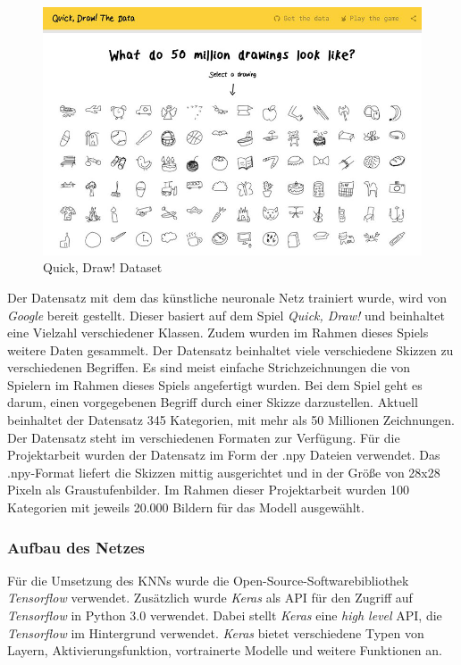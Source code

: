 \documentclass[11pt]{article}
\begin{document}
\begin{figure}[ht]
\centering
\includegraphics[width=1\textwidth]{images/QuickDrawData.jpg}
\caption{\label{fig:classDiagram}Quick, Draw! Dataset}
\end{figure}

Der Datensatz mit dem das künstliche neuronale Netz trainiert wurde, wird von \textit{Google} bereit gestellt. Dieser basiert auf dem Spiel \textit{Quick, Draw!} und beinhaltet eine Vielzahl verschiedener Klassen.  Zudem wurden im Rahmen dieses Spiels weitere Daten gesammelt. Der Datensatz beinhaltet viele verschiedene Skizzen zu verschiedenen Begriffen. Es sind meist einfache Strichzeichnungen die von Spielern im Rahmen dieses Spiels angefertigt wurden. Bei dem Spiel geht es darum, einen vorgegebenen Begriff durch einer Skizze darzustellen. Aktuell beinhaltet der Datensatz 345 Kategorien, mit mehr als 50 Millionen Zeichnungen. Der Datensatz steht im verschiedenen Formaten zur Verfügung.
Für die Projektarbeit wurden der Datensatz im Form der .npy Dateien verwendet. Das .npy-Format liefert die Skizzen mittig ausgerichtet und in der Größe von 28x28 Pixeln als Graustufenbilder.\parencite{GoogleCreativeLab2018}
Im Rahmen dieser Projektarbeit wurden 100 Kategorien mit jeweils 20.000 Bildern für das Modell ausgewählt.

\subsubsection{Aufbau des Netzes}
\label{sec:AufbauNetz}
Für die Umsetzung des KNNs wurde die Open-Source-Softwarebibliothek \textit{Tensorflow} verwendet. Zusätzlich wurde \textit{Keras} als API für den Zugriff auf \textit{Tensorflow} in Python 3.0 verwendet. Dabei stellt \textit{Keras} eine \textit{high level} API, die \textit{Tensorflow} im Hintergrund verwendet. \textit{Keras} bietet verschiedene Typen von Layern, Aktivierungsfunktion, vortrainerte Modelle und weitere Funktionen an.
\end{document}
